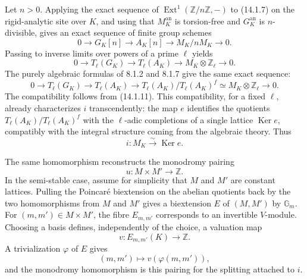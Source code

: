 \documentclass[12pt]{article}
\providecommand{\Ker}{\operatorname{Ker}}
\providecommand{\Ext}{\operatorname{Ext}}
\providecommand{\Z}{\mathbb Z}
\providecommand{\Gm}{\mathbb G_m}
\providecommand{\an}{\mathrm{an}}
\begin{document}
Let $n>0$.  Applying the exact sequence of $\Ext^1(\Z/n\Z,-)$ to (14.1.7) on the rigid-analytic site over $K$, and using that $M_K^{\an}$ is torsion-free and $G_K^{\an}$ is $n$-divisible, gives an exact sequence of finite group schemes
\begin{equation}\tag{14.2.1}
        0\longrightarrow G_K[n]\longrightarrow A_K[n]
        \longrightarrow M_K/nM_K\longrightarrow0.
\end{equation}
Passing to inverse limits over powers of a prime $\ell$ yields
\begin{equation}\tag{14.2.2}
        0\longrightarrow T_\ell(G_K)\longrightarrow T_\ell(A_K)
        \longrightarrow M_K\otimes\Z_\ell\longrightarrow0.
\end{equation}
The purely algebraic formulas of 8.1.2 and 8.1.7 give the same exact sequence:
\begin{equation}\tag{14.2.3}
        0\longrightarrow T_\ell(G_K)\longrightarrow T_\ell(A_K)
        \longrightarrow T_\ell(A_K)/T_\ell(A_K)^f
        \simeq M_K\otimes\Z_\ell\longrightarrow0.
\end{equation}
The compatibility follows from (14.1.11).  This compatibility, for a fixed $\ell$, already characterizes $i$ transcendently: the map $e$ identifies the quotients $T_\ell(A_K)/T_\ell(A_K)^f$ with the $\ell$-adic completions of a single lattice $\Ker e$, compatibly with the integral structure coming from the algebraic theory.  Thus
\begin{equation}\tag{14.2.3 bis}
        i:M_K\xrightarrow{\sim}\Ker e.
\end{equation}

The same homomorphism reconstructs the monodromy pairing
\begin{equation}\tag{14.2.4}
        u:M\times M'\longrightarrow\Z.
\end{equation}
In the semi-stable case, assume for simplicity that $M$ and $M'$ are constant lattices.  Pulling the Poincar\'e biextension on the abelian quotients back by the two homomorphisms from $M$ and $M'$ gives a biextension $E$ of $(M,M')$ by $\Gm$.  For $(m,m')\in M\times M'$, the fibre $E_{m,m'}$ corresponds to an invertible $V$-module.  Choosing a basis defines, independently of the choice, a valuation map
\[
        v:E_{m,m'}(K)\longrightarrow\Z.
\]
A trivialization $\varphi$ of $E$ gives
\begin{equation}\tag{14.2.5}
        (m,m')\longmapsto v(\varphi(m,m')),
\end{equation}
and the monodromy homomorphism is this pairing for the splitting attached to $i$.
\end{document}

